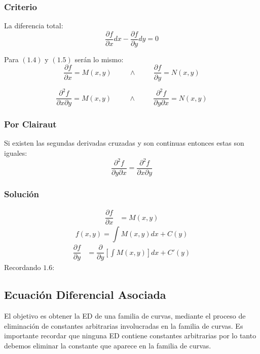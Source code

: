 \subsubsection{Criterio}
La diferencia total:
\begin{equation}
\dfrac{\partial f}{\partial x}dx - \dfrac{\partial f}{\partial y}dy=0
\end{equation}

Para $(1\texttt{.}4)$ y $(1\texttt{.} 5)$ serán lo mismo:
\begin{equation}
\dfrac{\partial f}{\partial x}=M(x,y) \hspace{1cm} \wedge \hspace{1cm} \dfrac{\partial f}{\partial y}=N(x,y)
\end{equation}

$$\dfrac{\partial^2 f}{\partial x \partial y}=M(x,y) \hspace{1cm} \wedge \hspace{1cm} \dfrac{\partial^2 f}{\partial y\partial x}=N(x,y)$$
\subsubsection{Por Clairaut}
Si existen las segundas derivadas cruzadas y son continuas entonces estas son iguales:
$$\dfrac{\partial^2 f}{\partial y\partial x}=\dfrac{\partial^2 f}{\partial x\partial y}$$
\subsubsection{Solución}
\begin{align*}
\dfrac{\partial f}{\partial x} & = M(x,y)
\end{align*}
\begin{equation}
f(x,y)= \int M(x,y) dx + C(y)
\end{equation}
\begin{align*}
\dfrac{\partial f}{\partial y} & = \dfrac{\partial}{\partial y}\left[\int M(x,y)\right]  dx + C'(y) 
\end{align*}
Recordando $1\texttt{.}6$:
\subsection{Ecuación Diferencial Asociada}
El objetivo es obtener la ED de una familia de curvas, mediante el proceso de eliminación de constantes arbitrarias involucradas en la familia de curvas. Es importante recordar que ninguna ED contiene constantes arbitrarias por lo tanto debemos eliminar la constante que aparece en la familia de curvas.

